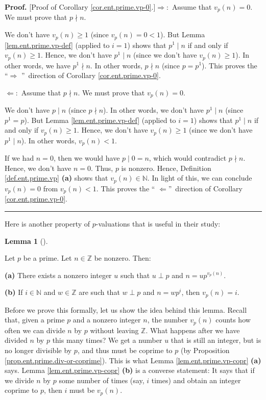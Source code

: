 \documentclass[numbers=enddot,12pt,final,onecolumn,notitlepage]{scrartcl}%
\numberwithin{exer}{subsection}
\theoremstyle{definition}
\newtheorem{lem}[theo]{Lemma}
\newenvironment{lemma}[1][]
{\begin{lem}[#1]\begin{leftbar}}
{\end{leftbar}\end{lem}}
\newenvironment{proof}[1][Proof]{\noindent\textbf{#1.} }{\ \rule{0.5em}{0.5em}}
\begin{document}
\begin{proof}
[Proof of Corollary \ref{cor.ent.prime.vp-0}.]$\Longrightarrow:$ Assume that
$v_{p}\left(  n\right)  =0$. We must prove that $p\nmid n$.

We don't have $v_{p}\left(  n\right)  \geq1$ (since $v_{p}\left(  n\right)
=0<1$). But Lemma \ref{lem.ent.prime.vp-def} (applied to $i=1$) shows that
$p^{1}\mid n$ if and only if $v_{p}\left(  n\right)  \geq1$. Hence, we don't
have $p^{1}\mid n$ (since we don't have $v_{p}\left(  n\right)  \geq1$). In
other words, we have $p^{1}\nmid n$. In other words, $p\nmid n$ (since
$p=p^{1}$). This proves the \textquotedblleft$\Longrightarrow$%
\textquotedblright\ direction of Corollary \ref{cor.ent.prime.vp-0}.

$\Longleftarrow:$ Assume that $p\nmid n$. We must prove that $v_{p}\left(
n\right)  =0$.

We don't have $p\mid n$ (since $p\nmid n$). In other words, we don't have
$p^{1}\mid n$ (since $p^{1}=p$). But Lemma \ref{lem.ent.prime.vp-def} (applied
to $i=1$) shows that $p^{1}\mid n$ if and only if $v_{p}\left(  n\right)
\geq1$. Hence, we don't have $v_{p}\left(  n\right)  \geq1$ (since we don't
have $p^{1}\mid n$). In other words, $v_{p}\left(  n\right)  <1$.

If we had $n=0$, then we would have $p\mid0=n$, which would contradict $p\nmid
n$. Hence, we don't have $n=0$. Thus, $p$ is nonzero. Hence, Definition
\ref{def.ent.prime.vp} \textbf{(a)} shows that $v_{p}\left(  n\right)
\in\mathbb{N}$. In light of this, we can conclude $v_{p}\left(  n\right)  =0$
from $v_{p}\left(  n\right)  <1$. This proves the \textquotedblleft%
$\Longleftarrow$\textquotedblright\ direction of Corollary
\ref{cor.ent.prime.vp-0}.
\end{proof}

Here is another property of $p$-valuations that is useful in their study:

\begin{lemma}
\label{lem.ent.prime.vp-copr}Let $p$ be a prime. Let $n\in\mathbb{Z}$ be
nonzero. Then:

\textbf{(a)} There exists a nonzero integer $u$ such that $u\perp p$ and
$n=up^{v_{p}\left(  n\right)  }$.

\textbf{(b)} If $i\in\mathbb{N}$ and $w\in\mathbb{Z}$ are such that $w\perp p$
and $n=wp^{i}$, then $v_{p}\left(  n\right)  =i$.
\end{lemma}

Before we prove this formally, let us show the idea behind this lemma. Recall
that, given a prime $p$ and a nonzero integer $n$, the number $v_{p}\left(
n\right)  $ counts how often we can divide $n$ by $p$ without leaving
$\mathbb{Z}$. What happens after we have divided $n$ by $p$ this many times?
We get a number $u$ that is still an integer, but is no longer divisible by
$p$, and thus must be coprime to $p$ (by Proposition
\ref{prop.ent.prime.div-or-coprime}). This is what Lemma
\ref{lem.ent.prime.vp-copr} \textbf{(a)} says. Lemma
\ref{lem.ent.prime.vp-copr} \textbf{(b)} is a converse statement: It says that
if we divide $n$ by $p$ some number of times (say, $i$ times) and obtain an
integer coprime to $p$, then $i$ must be $v_{p}\left(  n\right)  $.
\end{document}
